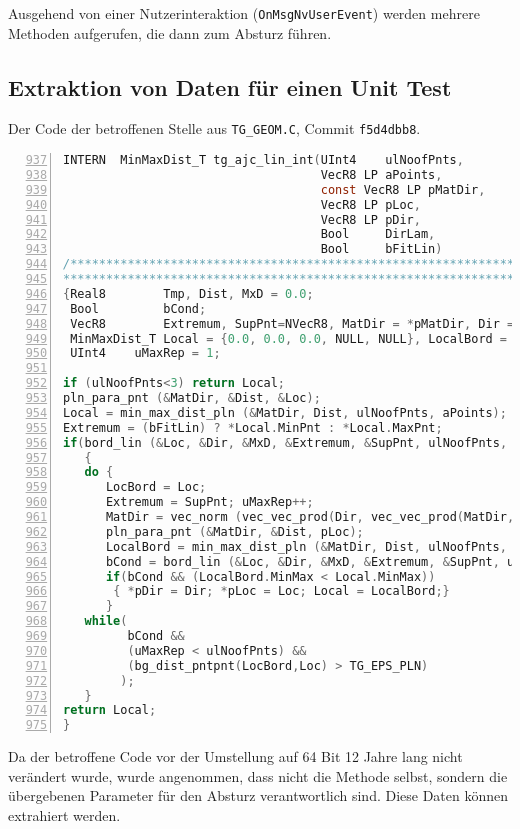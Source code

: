 Ausgehend von einer Nutzerinteraktion (\verb|OnMsgNvUserEvent|) werden mehrere Methoden aufgerufen, die dann zum Absturz führen.

\subsection{Extraktion von Daten für einen Unit Test}

Der Code der betroffenen Stelle aus \verb|TG_GEOM.C|, Commit \verb|f5d4dbb8|.

\begin{lstlisting}[language=C, numbers=left, firstnumber=937]
INTERN  MinMaxDist_T tg_ajc_lin_int(UInt4    ulNoofPnts,
                                    VecR8 LP aPoints,
                                    const VecR8 LP pMatDir,
                                    VecR8 LP pLoc,
                                    VecR8 LP pDir,
                                    Bool     DirLam,
                                    Bool     bFitLin)
/*************************************************************************
*************************************************************************/
{Real8        Tmp, Dist, MxD = 0.0;
 Bool         bCond;
 VecR8        Extremum, SupPnt=NVecR8, MatDir = *pMatDir, Dir = *pDir, Loc = *pLoc, LocBord;
 MinMaxDist_T Local = {0.0, 0.0, 0.0, NULL, NULL}, LocalBord = {0.0, 0.0, 0.0, NULL, NULL};
 UInt4    uMaxRep = 1;

if (ulNoofPnts<3) return Local;
pln_para_pnt (&MatDir, &Dist, &Loc);
Local = min_max_dist_pln (&MatDir, Dist, ulNoofPnts, aPoints);
Extremum = (bFitLin) ? *Local.MinPnt : *Local.MaxPnt;
if(bord_lin (&Loc, &Dir, &MxD, &Extremum, &SupPnt, ulNoofPnts, aPoints, DirLam))
   {
   do {
      LocBord = Loc;
      Extremum = SupPnt; uMaxRep++;
      MatDir = vec_norm (vec_vec_prod(Dir, vec_vec_prod(MatDir, Dir)), &Tmp);
      pln_para_pnt (&MatDir, &Dist, pLoc);
      LocalBord = min_max_dist_pln (&MatDir, Dist, ulNoofPnts, aPoints);
      bCond = bord_lin (&Loc, &Dir, &MxD, &Extremum, &SupPnt, ulNoofPnts, aPoints, DirLam);
      if(bCond && (LocalBord.MinMax < Local.MinMax))
       { *pDir = Dir; *pLoc = Loc; Local = LocalBord;}
      }
   while(
         bCond && 
         (uMaxRep < ulNoofPnts) && 
         (bg_dist_pntpnt(LocBord,Loc) > TG_EPS_PLN)
        );
   }
return Local;
}
\end{lstlisting}

Da der betroffene Code vor der Umstellung auf 64 Bit 12 Jahre lang nicht verändert wurde, wurde angenommen, dass nicht die Methode selbst, sondern die übergebenen Parameter für den Absturz verantwortlich sind.
Diese Daten können extrahiert werden.

